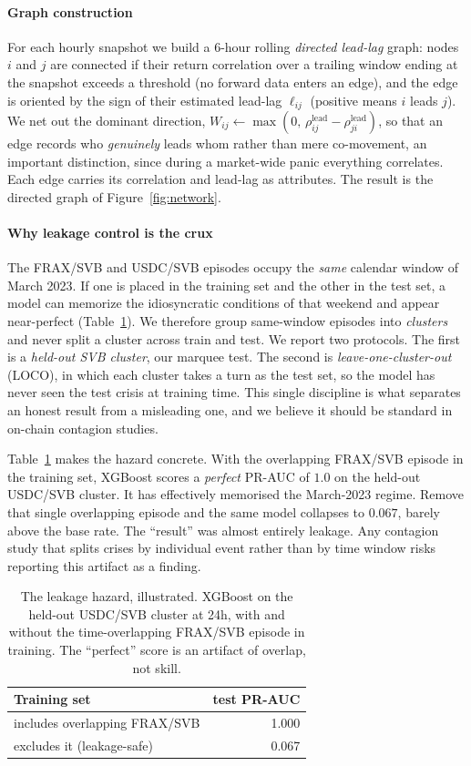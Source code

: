 \documentclass[sigconf,anonymous]{acmart}
\begin{document}
\paragraph{Graph construction} For each hourly snapshot we build a 6-hour rolling \emph{directed
lead-lag} graph: nodes $i$ and $j$ are connected if their return correlation over a trailing window
ending at the snapshot exceeds a threshold (no forward data enters an edge), and the edge is
oriented by the sign of their estimated lead-lag $\ell_{ij}$ (positive means $i$ leads $j$). We net
out the dominant direction,
$W_{ij}\leftarrow\max(0,\,\rho_{ij}^{\text{lead}}-\rho_{ji}^{\text{lead}})$, so that an edge records
who \emph{genuinely} leads whom rather than mere co-movement, an important distinction, since during
a market-wide panic everything correlates. Each edge carries its correlation and lead-lag as
attributes. The result is the directed graph of Figure~\ref{fig:network}.

\paragraph{Why leakage control is the crux} The FRAX/SVB and USDC/SVB episodes occupy the
\emph{same} calendar window of March 2023. If one is placed in the training set and the other in the
test set, a model can memorize the idiosyncratic conditions of that weekend and appear
near-perfect (Table~\ref{tab:leakage}). We therefore group same-window episodes into \emph{clusters} and never
split a cluster across train and test. We report two protocols. The first is a \emph{held-out SVB
cluster}, our marquee test. The second is \emph{leave-one-cluster-out} (LOCO), in which each cluster
takes a turn as the test set, so the model has never seen the test crisis at training time. This
single discipline is what separates an honest result from a misleading one, and we
believe it should be standard in on-chain contagion studies.

Table~\ref{tab:leakage} makes the hazard concrete. With the overlapping FRAX/SVB episode in the
training set, XGBoost scores a \emph{perfect} PR-AUC of $1.0$ on the held-out USDC/SVB cluster. It
has effectively memorised the March-2023 regime. Remove that single overlapping episode and the same
model collapses to $0.067$, barely above the base rate. The ``result'' was almost entirely leakage.
Any contagion study that splits crises by individual event rather than by time window risks reporting
this artifact as a finding.

\begin{table}[t]
\caption{The leakage hazard, illustrated. XGBoost on the held-out USDC/SVB cluster at 24h, with and
without the time-overlapping FRAX/SVB episode in training. The ``perfect'' score is an artifact of
overlap, not skill.}
\label{tab:leakage}
\small
\begin{tabular}{lr}
\toprule
Training set & test PR-AUC \\
\midrule
includes overlapping FRAX/SVB & 1.000 \\
excludes it (leakage-safe) & 0.067 \\
\bottomrule
\end{tabular}
\end{table}
\end{document}
